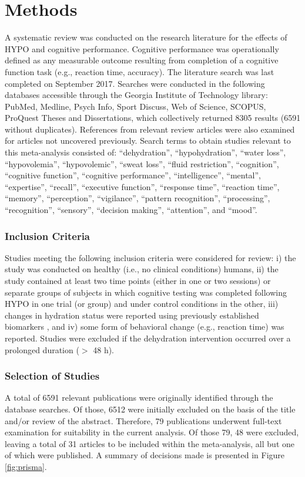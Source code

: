 \section{Methods}
A systematic review was conducted on the research literature for the effects of HYPO and cognitive performance. Cognitive performance was operationally defined as any measurable outcome resulting from completion of a cognitive function task (e.g., reaction time, accuracy). The literature search was last completed on September 2017. Searches were conducted in the following databases accessible through the Georgia Institute of Technology library: PubMed, Medline, Psych Info, Sport Discuss, Web of Science, SCOPUS, ProQuest Theses and Dissertations, which collectively returned 8305 results (6591 without duplicates). References from relevant review articles were also examined \cite{lieberman_hydration_2007,masento_effects_2014,benton_small_2015} for articles not uncovered previously. Search terms to obtain studies relevant to this meta-analysis consisted of: ``dehydration”, ``hypohydration”, ``water loss”, ``hypovolemia”, ``hypovolemic”, ``sweat loss”, ``fluid restriction”, ``cognition”, ``cognitive function”, ``cognitive performance”, ``intelligence”, ``mental”, ``expertise”, ``recall”, ``executive function”, ``response time”, ``reaction time”, ``memory”, ``perception”, ``vigilance”, ``pattern recognition”, ``processing”, ``recognition”, ``sensory”, ``decision making”, ``attention”, and ``mood”. 

\subsubsection{Inclusion Criteria}
Studies meeting the following inclusion criteria were considered for review: i) the study was conducted on healthy (i.e., no clinical conditions) humans, ii) the study contained at least two time points (either in one or two sessions) or separate groups of subjects in which cognitive testing was completed following HYPO in one trial (or group) and under control conditions in the other, iii) changes in hydration status were reported using previously established biomarkers \cite{cheuvront_physiologic_2013}, and iv) some form of behavioral change (e.g., reaction time) was reported. Studies were excluded if the dehydration intervention occurred over a prolonged duration (${>}$ 48 h).     

\subsubsection{Selection of Studies}
A total of 6591 relevant publications were originally identified through the database searches. Of those, 6512 were initially excluded on the basis of the title and/or review of the abstract. Therefore, 79 publications underwent full-text examination for suitability in the current analysis. Of those 79, 48 were excluded, leaving a total of 31 articles to be included within the meta-analysis, all but one of which were published. A summary of decisions made is presented in Figure \ref{fig:prisma}.


